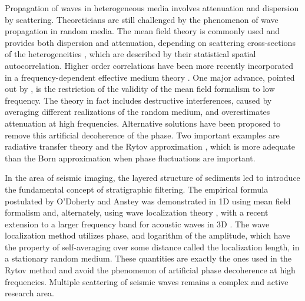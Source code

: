 Propagation of waves in heterogeneous media involves attenuation and
dispersion by scattering.  Theoreticians are still challenged by the
phenomenon of wave propagation in random media. The mean field theory
\cite[]{Chernov_60,Karal_K64,Uscinski_77} is commonly used and
provides both dispersion and attenuation, depending on scattering
cross-sections of the heterogeneities
\cite[]{Waterman_T61,Wu_A85,Kanaun_L08}, which are described by their
statistical spatial autocorrelation.  Higher order correlations have
been more recently incorporated in a frequency-dependent effective
medium theory \cite[]{Chesnokov_KK98}.  One major advance, pointed out
by \cite{Wu_82,Wu_A85}, is the restriction of the validity of the mean
field formalism to low frequency.  The theory in fact includes
destructive interferences, caused by averaging different realizations
of the random medium, and overestimates attenuation at high
frequencies.  Alternative solutions have been proposed to remove this
artificial decoherence of the phase.  Two important examples are
radiative transfer theory \cite[]{Wu_93,Haney_WS05} and the Rytov
approximation \cite[]{Rytov_KT89}, which is more adequate than the
Born approximation when phase fluctuations are important.

In the area of seismic imaging, the layered structure of sediments led
\cite{Odoherty_A71} to introduce the fundamental concept of
stratigraphic filtering.  The empirical formula postulated by
O'Doherty and Anstey was demonstrated in 1D using mean field formalism
\cite[]{Banik_LS85,Resnick_90} and, alternately, using wave
localization theory \cite[]{Sheng_WZP86,Shapiro_Z93,Shapiro_H99}, with
a recent extension to a larger frequency band for acoustic waves in 3D
\cite[]{Muller_S01}.  The wave localization method utilizes phase, and
logarithm of the amplitude, which have the property of self-averaging
over some distance called the localization length, in a stationary
random medium.  These quantities are exactly the ones used in the
Rytov method and avoid the phenomenon of artificial phase decoherence
at high frequencies.  Multiple scattering of seismic waves remains a
complex and active research area.

